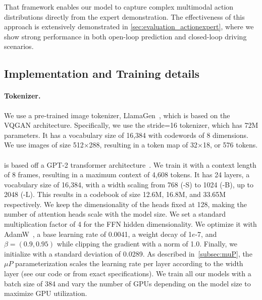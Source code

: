 That framework enables our model to capture complex multimodal action distributions directly from the expert demonstration. The effectiveness of this approach is extensively demonstrated in \autoref{sec:evaluation_actionexpert}, where we show strong performance in both open-loop prediction and closed-loop driving scenarios.


\subsection{Implementation and Training details}

\paragraph{Tokenizer.}
We use a pre-trained image tokenizer, LlamaGen~\cite{sun2024llamagen}, which is based on the VQGAN architecture. Specifically, we use the stride=16 tokenizer, which has 72M parameters. It has a vocabulary size of 16,384 with codewords of 8 dimensions. We use images of size 512$
\times$288, resulting in a token map of 32$
\times$18, or 576 tokens.

\paragraph{\vm} is based off a GPT-2 transformer architecture~\cite{radford2019language}. We train it with a context length of 8 frames, resulting in a maximum context of 4,608 tokens. It has 24 layers, a vocabulary size of 16,384, with a width scaling from 768 (\vm-S) to 1024 (\vm-B), up to 2048 (\vm-L). This results in a codebook of size 
 12.6M, 16.8M, and 33.65M respectively. We keep the dimensionality of the heads fixed at 128, making the number of attention heads scale with the model size. We set a standard multiplication factor of 4 for the FFN hidden dimensionality. We optimize it with AdamW~\cite{AdamW}, a base learning rate of 0.0041, a weight decay of 1$e$-7, and $\beta=(0.9, 0.95)$ while clipping the gradient with a norm of 1.0. Finally, we initialize with a standard deviation of 0.0289. As described in~\autoref{subsec:muP}, the $\mu P$ parameterization scales the learning rate per layer according to the width layer (see our code or \cite{yang2022miup} from exact specifications). We train all our models with a batch size of 384 and vary the number of GPUs depending on the model size to maximize GPU utilization.

